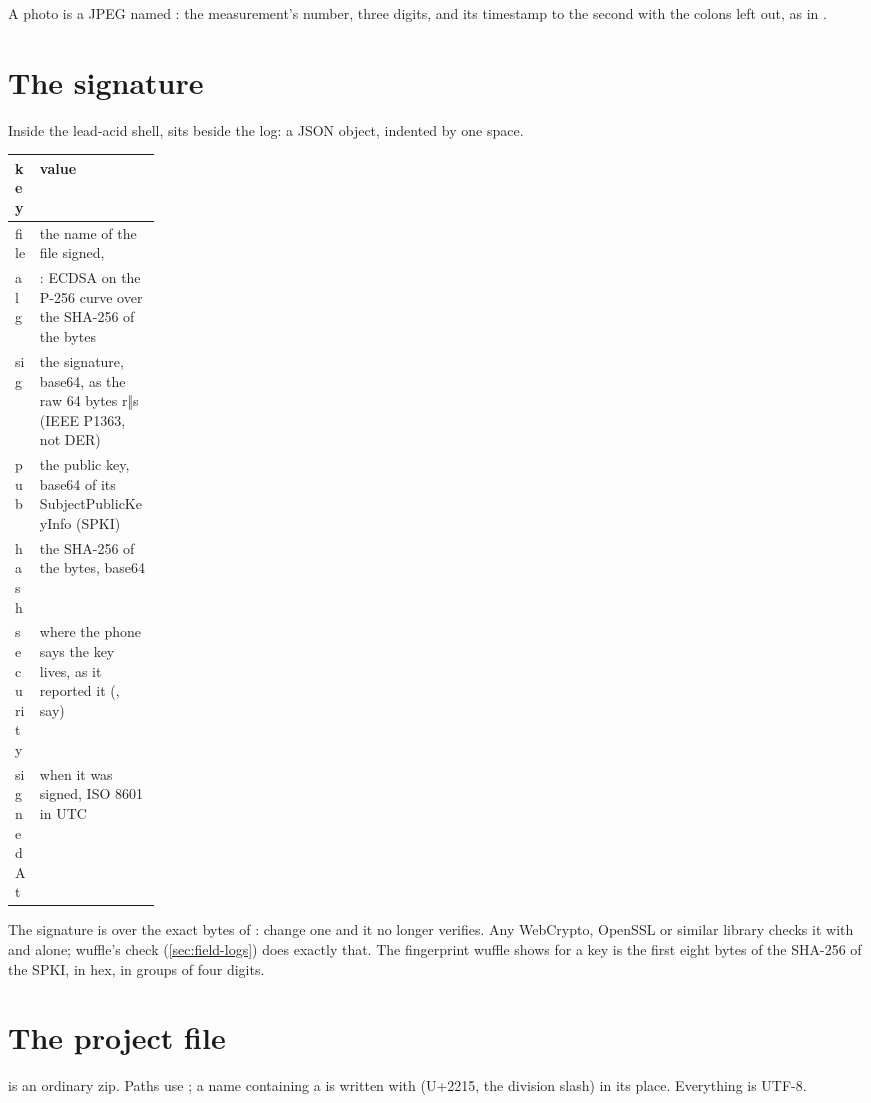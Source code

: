 A photo is a JPEG named : the measurement's number, three digits, and
its timestamp to the second with the colons left out, as in .

\section{The signature}\label{sec:format-sig}

Inside the lead-acid shell,  sits beside the log: a JSON object, indented by one
space.

\begin{center}\small
\begin{tabularx}{\linewidth}{@{}>{\ttfamily\raggedright}p{0.17\linewidth}L@{}}\toprule
\normalfont\sffamily\bfseries key & \sffamily\bfseries value \\\midrule
file & the name of the file signed,  \\
alg & : ECDSA on the P-256 curve over the SHA-256 of the bytes \\
sig & the signature, base64, as the raw 64 bytes r‖s (IEEE P1363, not DER) \\
pub & the public key, base64 of its SubjectPublicKeyInfo (SPKI) \\
hash & the SHA-256 of the bytes, base64 \\
security & where the phone says the key lives, as it reported it (, say) \\
signedAt & when it was signed, ISO 8601 in UTC \\
\bottomrule\end{tabularx}
\end{center}

The signature is over the exact bytes of : change one and it no longer verifies. Any
WebCrypto, OpenSSL or similar library checks it with  and  alone; wuffle's check
(\cref{sec:field-logs}) does exactly that. The fingerprint wuffle shows for a key is the first eight
bytes of the SHA-256 of the SPKI, in hex, in groups of four digits.

\section{The project file}\label{sec:format-zip}

 is an ordinary zip. Paths use \file{/}; a
name containing a \file{/} is written with  (U+2215, the division slash) in its place.
Everything is UTF-8.

